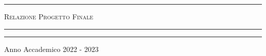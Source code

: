 \begin{titlepage}
\bigskip

\bigskip

\bigskip

\bigskip

\bigskip

\bigskip

\begin{minipage}[b]{8 cm}
	\hrule
	
	\bigskip
	
	{\centering \scshape Relazione Progetto Finale\par}
	
	\bigskip
	
	\hrule
\end{minipage}

\bigskip

\bigskip

\bigskip

\bigskip

\bigskip

\bigskip

\bigskip

\bigskip


%	
%	

\bigskip

\bigskip

\bigskip

\bigskip

\bigskip

\bigskip

\bigskip

\bigskip

\bigskip

\bigskip

\bigskip

\bigskip

\hrule

\bigskip

{
	Anno Accademico 2022 - 2023\par
}
\end{titlepage}

